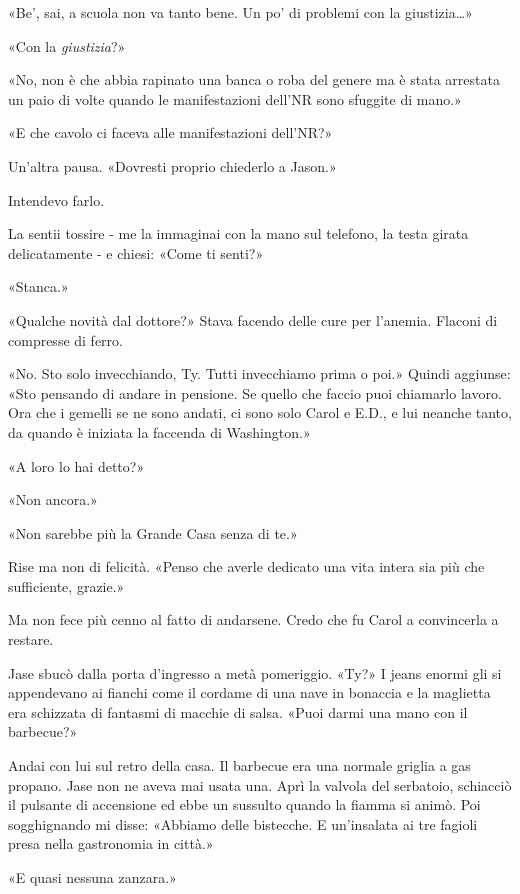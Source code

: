 «Be', sai, a scuola non va tanto bene. Un po' di problemi con la
giustizia\ldots»

«Con la \emph{giustizia}?»

«No, non è che abbia rapinato una banca o roba del genere ma è stata
arrestata un paio di volte quando le manifestazioni dell'NR sono
sfuggite di mano.»

«E che cavolo ci faceva alle manifestazioni dell'NR?»

Un'altra pausa. «Dovresti proprio chiederlo a Jason.»

Intendevo farlo.

La sentii tossire - me la immaginai con la mano sul telefono, la testa
girata delicatamente - e chiesi: «Come ti senti?»

«Stanca.»

«Qualche novità dal dottore?» Stava facendo delle cure per l'anemia.
Flaconi di compresse di ferro.

«No. Sto solo invecchiando, Ty. Tutti invecchiamo prima o poi.» Quindi
aggiunse: «Sto pensando di andare in pensione. Se quello che faccio puoi
chiamarlo lavoro. Ora che i gemelli se ne sono andati, ci sono solo
Carol e E.D., e lui neanche tanto, da quando è iniziata la faccenda di
Washington.»

«A loro lo hai detto?»

«Non ancora.»

«Non sarebbe più la Grande Casa senza di te.»

Rise ma non di felicità. «Penso che averle dedicato una vita intera sia
più che sufficiente, grazie.»

Ma non fece più cenno al fatto di andarsene. Credo che fu Carol a
convincerla a restare.

\separatorefiori

Jase sbucò dalla porta d'ingresso a metà pomeriggio. «Ty?» I jeans
enormi gli si appendevano ai fianchi come il cordame di una nave in
bonaccia e la maglietta era schizzata di fantasmi di macchie di salsa.
«Puoi darmi una mano con il barbecue?»

Andai con lui sul retro della casa. Il barbecue era una normale griglia
a gas propano. Jase non ne aveva mai usata una. Aprì la valvola del
serbatoio, schiacciò il pulsante di accensione ed ebbe un sussulto
quando la fiamma si animò. Poi sogghignando mi disse: «Abbiamo delle
bistecche. E un'insalata ai tre fagioli presa nella gastronomia in
città.»

«E quasi nessuna zanzara.»

